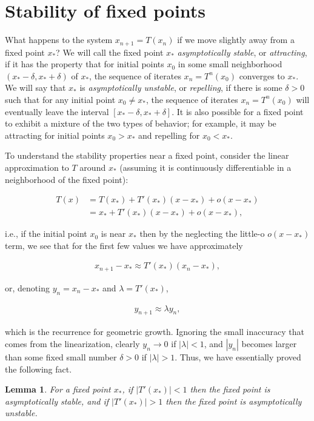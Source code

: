 \documentclass[11pt]{report}
\theoremstyle{plain}
\newtheorem{lem}[thm]{Lemma}
\theoremstyle{definition}
\begin{document}
\section{Stability of fixed points}
What happens to the system $x_{n+1}=T(x_n)$ if we
move slightly away from a fixed point $x_*$? We will
call the fixed point $x_*$ \emph{asymptotically stable},
or \emph{attracting}, if it has the property that for
initial points $x_0$ in some small neighborhood
$(x_*-\delta, x_*+\delta)$ of $x_*$, the sequence of
iterates $x_n = T^n(x_0)$ converges to $x_*$. We will
say that $x_*$ is \emph{asymptotically unstable}, or
\emph{repelling}, if there is some $\delta>0$ such that
for any initial point $x_0\neq x_*$, the sequence of
iterates $x_n=T^n(x_0)$ will eventually leave the
interval $[x_*-\delta,x_*+\delta]$. It is also
possible for a fixed point to exhibit a mixture of the
two types of behavior; for example, it may be
attracting for initial points $x_0>x_*$ and repelling
for $x_0<x_*$.

To understand the stability properties near a fixed
point, consider the linear approximation to $T$
around $x_*$ (assuming it is continuously
differentiable in a neighborhood of the fixed point):

\begin{align*}
T(x) &= T(x_*) + T'(x_*) (x-x_*) + o(x-x_*) \\ &= x_* + T'(x_*) (x-x_*) + o(x-x_*),
\end{align*}

i.e., if the initial point $x_0$ is near $x_*$ then
by the neglecting the little-o $o(x-x_*)$ term, we
see that for the first few values we have
approximately

\begin{align*}
x_{n+1} - x_* \approx T'(x_*) (x_n-x_*),
\end{align*}

or, denoting $y_n = x_n-x_*$ and $\lambda=T'(x_*)$,

\begin{align*}
y_{n+1} \approx \lambda y_n,
\end{align*}

which is the recurrence for geometric growth.
Ignoring the small inaccuracy that comes from the
linearization, clearly $y_n\to 0$ if $|\lambda|<1$,
and $|y_n|$ becomes larger than some fixed small
number $\delta>0$ if $|\lambda|>1$. Thus, we have
essentially proved the following fact.

\begin{lem}
\label{lem-fixedpoint-stability}
For a fixed point $x_*$, if $|T'(x_*)|<1$ then the
fixed point is asymptotically stable, and if
$|T'(x_*)|>1$ then the fixed point is asymptotically
unstable.
\end{lem}
\end{document}

